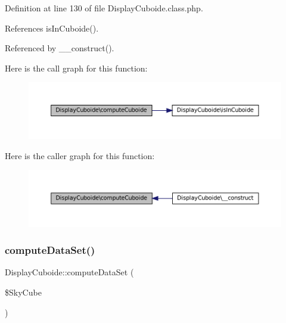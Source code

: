 Definition at line 130 of file Display\+Cuboide.\+class.\+php.



References is\+In\+Cuboide().



Referenced by \+\_\+\+\_\+construct().

Here is the call graph for this function\+:\nopagebreak
\begin{figure}[H]
\begin{center}
\leavevmode
\includegraphics[width=350pt]{class_display_cuboide_ade706d53e065cd76a38c2e998d36f81c_cgraph}
\end{center}
\end{figure}
Here is the caller graph for this function\+:\nopagebreak
\begin{figure}[H]
\begin{center}
\leavevmode
\includegraphics[width=350pt]{class_display_cuboide_ade706d53e065cd76a38c2e998d36f81c_icgraph}
\end{center}
\end{figure}
\mbox{\label{class_display_cuboide_a40d7338cee6f9b27e2772864b71edcab}} 
\subsubsection{\texorpdfstring{compute\+Data\+Set()}{computeDataSet()}}
{\footnotesize\ttfamily Display\+Cuboide\+::compute\+Data\+Set (\begin{DoxyParamCaption}\item[{}]{\$\+Sky\+Cube }\end{DoxyParamCaption})\hspace{0.3cm}{\ttfamily [protected]}}



